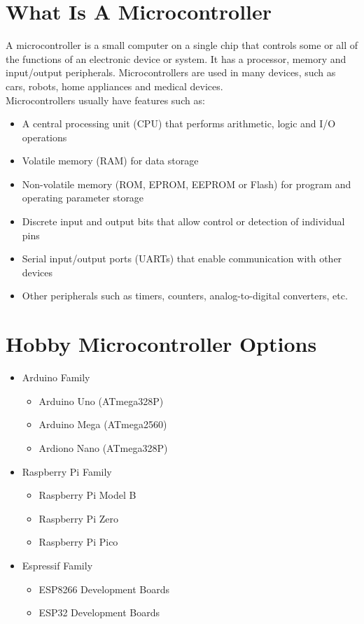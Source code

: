 \documentclass[a4paper,12pt]{report}
\begin{document}
\newpage

\section*{What Is A Microcontroller}

    A microcontroller is a small computer on a single chip that controls some or all of the 
    functions of an electronic device or system. It has a processor, memory and input/output 
    peripherals. Microcontrollers are used in many devices, such as cars, robots, home appliances
    and medical devices. \\


    Microcontrollers usually have features such as:

    \begin{itemize}
        \item A central processing unit (CPU) that performs arithmetic, logic and I/O operations
        \item Volatile memory (RAM) for data storage
        \item Non-volatile memory (ROM, EPROM, EEPROM or Flash) for program and operating parameter storage
        \item Discrete input and output bits that allow control or detection of individual pins
        \item Serial input/output ports (UARTs) that enable communication with other devices
        \item Other peripherals such as timers, counters, analog-to-digital converters, etc.
    \end{itemize}
    

\section*{Hobby Microcontroller Options}
    \begin{itemize}
        \item Arduino Family
        \begin{itemize}
            \item Arduino Uno (ATmega328P)
            \item Arduino Mega (ATmega2560)
            \item Ardiono Nano (ATmega328P)
        \end{itemize}
        \item Raspberry Pi Family 
        \begin{itemize}
            \item Raspberry Pi Model B
            \item Raspberry Pi Zero
            \item Raspberry Pi Pico
        \end{itemize}
        \item Espressif Family
        \begin{itemize}
            \item ESP8266 Development Boards
            \item ESP32 Development Boards
        \end{itemize}
    \end{itemize}
\end{document}
